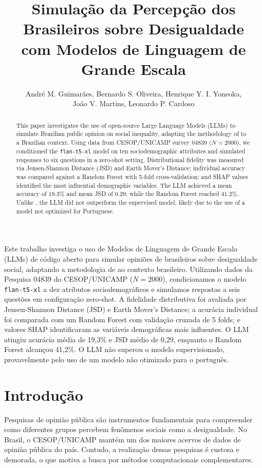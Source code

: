 \documentclass[12pt]{article}
\title{Simulação da Percepção dos Brasileiros sobre Desigualdade\\
       com Modelos de Linguagem de Grande Escala}
\author{André M. Guimarães\inst{1}, Bernardo S. Oliveira\inst{1}, Henrique Y. I. Yoneoka\inst{1},\\
        João V. Martins\inst{1}, Leonardo P. Cardoso\inst{1}}
\begin{document}
\maketitle

\begin{abstract}
This paper investigates the use of open-source Large Language Models (LLMs)
to simulate Brazilian public opinion on social inequality, adapting the
methodology of \cite{miranda2025} to a Brazilian context.
Using data from CESOP/UNICAMP survey 04839 ($N=2000$), we conditioned the
\texttt{flan-t5-xl} model on ten sociodemographic attributes and simulated
responses to six questions in a zero-shot setting.
Distributional fidelity was measured via Jensen-Shannon Distance (JSD) and
Earth Mover's Distance; individual accuracy was compared against a Random Forest
with 5-fold cross-validation; and SHAP values identified the most influential
demographic variables.
The LLM achieved a mean accuracy of 19.3\% and mean JSD of 0.29, while the
Random Forest reached 41.2\%. Unlike \cite{miranda2025}, the LLM did not
outperform the supervised model, likely due to the use of a model not
optimized for Portuguese.
\end{abstract}

\begin{resumo}
Este trabalho investiga o uso de Modelos de Linguagem de Grande Escala (LLMs)
de código aberto para simular opiniões de brasileiros sobre desigualdade social,
adaptando a metodologia de \cite{miranda2025} ao contexto brasileiro.
Utilizando dados da Pesquisa 04839 do CESOP/UNICAMP ($N=2000$), condicionamos
o modelo \texttt{flan-t5-xl} a dez atributos sociodemográficos e simulamos
respostas a seis questões em configuração zero-shot.
A fidelidade distributiva foi avaliada por Jensen-Shannon Distance (JSD) e
Earth Mover's Distance; a acurácia individual foi comparada com um Random Forest
com validação cruzada de 5 folds; e valores SHAP identificaram as variáveis
demográficas mais influentes.
O LLM atingiu acurácia média de 19,3\% e JSD médio de 0,29, enquanto o
Random Forest alcançou 41,2\%. O LLM não superou o modelo supervisionado,
provavelmente pelo uso de um modelo não otimizado para o português.
\end{resumo}


\section{Introdução}

Pesquisas de opinião pública são instrumentos fundamentais para compreender
como diferentes grupos percebem fenômenos sociais como a desigualdade.
No Brasil, o CESOP/UNICAMP \cite{cesop2023} mantém um dos maiores acervos
de dados de opinião pública do país. Contudo, a realização dessas pesquisas
é custosa e demorada, o que motiva a busca por métodos computacionais
complementares.
\end{document}

